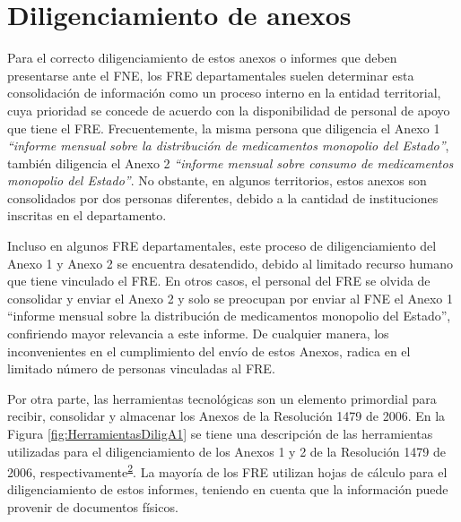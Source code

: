 \documentclass[
  oneside]{book}
\begin{document}
\hypertarget{diligenciamiento-de-anexos}{%
\section{Diligenciamiento de anexos}\label{diligenciamiento-de-anexos}}

Para el correcto diligenciamiento de estos anexos o informes que deben presentarse ante el FNE, los FRE departamentales suelen determinar esta consolidación de información como un proceso interno en la entidad territorial, cuya prioridad se concede de acuerdo con la disponibilidad de personal de apoyo que tiene el FRE. Frecuentemente, la misma persona que diligencia el Anexo 1 \emph{``informe mensual sobre la distribución de medicamentos monopolio del Estado''}, también diligencia el Anexo 2 \emph{``informe mensual sobre consumo de medicamentos monopolio del Estado''}. No obstante, en algunos territorios, estos anexos son consolidados por dos personas diferentes, debido a la cantidad de instituciones inscritas en el departamento.

Incluso en algunos FRE departamentales, este proceso de diligenciamiento del Anexo 1 y Anexo 2 se encuentra desatendido, debido al limitado recurso humano que tiene vinculado el FRE. En otros casos, el personal del FRE se olvida de consolidar y enviar el Anexo 2 y solo se preocupan por enviar al FNE el Anexo 1 ``informe mensual sobre la distribución de medicamentos monopolio del Estado'', confiriendo mayor relevancia a este informe. De cualquier manera, los inconvenientes en el cumplimiento del envío de estos Anexos, radica en el limitado número de personas vinculadas al FRE.

Por otra parte, las herramientas tecnológicas son un elemento primordial para recibir, consolidar y almacenar los Anexos de la Resolución 1479 de 2006. En la Figura \ref{fig:HerramientasDiligA1} se tiene una descripción de las herramientas utilizadas para el diligenciamiento de los Anexos 1 y 2 de la Resolución 1479 de 2006, respectivamente\textsuperscript{\protect\hyperlink{ref-MSPS1479-2006}{2}}. La mayoría de los FRE utilizan hojas de cálculo para el diligenciamiento de estos informes, teniendo en cuenta que la información puede provenir de documentos físicos.
\end{document}
